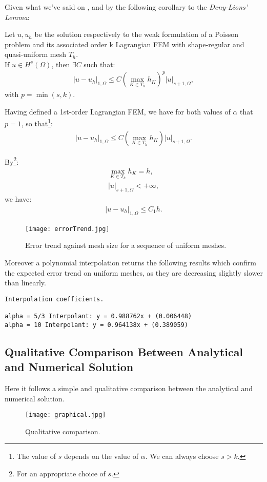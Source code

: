 Given what we've said on , and by the following corollary to the \textit{Deny-Lions' Lemma}:

\begin{theorem}
	Let $u, u_h$ be the solution respectively to the weak formulation of a Poisson problem and its associated order k Lagrangian FEM with shape-regular and quasi-uniform mesh $T_h$. \\ 
	If $u \in H^s(\Omega)$, then $\exists C$ such that:
	\begin{gather}
		|u - u_h|_{1, \Omega} \le C (\max_{K \in T_h} h_K)^{p}|u|_{s+1, \Omega},
	\end{gather}
	with $p = \min(s, k)$.
\end{theorem}

Having defined a 1st-order Lagrangian FEM, we have for both values of $\alpha$ that $p = 1$, so that\footnote{The value of $s$ depends on the value of $\alpha$. We can always choose $s > k$.}:
\begin{gather}
	|u - u_h|_{1, \Omega} \le C (\max_{K \in T_h} h_K)|u|_{s+1, \Omega}.
\end{gather}

By\footnote{For an appropriate choice of $s$.}:
\begin{gather}
	\max_{K \in T_h} h_K = h, \\
	|u|_{s+1, \Omega} < +\infty,
\end{gather}
we have:
\begin{gather}
	|u - u_h|_{1, \Omega} \le C_1 h.
\end{gather}

\begin{figure}[!ht]
	\centering
	\texttt{[image: errorTrend.jpg]}
	\caption{Error trend against mesh size for a sequence of uniform meshes.}
\end{figure}

\noindent Moreover a polynomial interpolation returns the following results which confirm the expected error trend on uniform meshes, as they are decreasing slightly slower than linearly.
\begin{verbatim}
Interpolation coefficients.

alpha = 5/3 Interpolant: y = 0.988762x + (0.006448)
alpha = 10 Interpolant: y = 0.964138x + (0.389059)
\end{verbatim}

\subsection{Qualitative Comparison Between Analytical and Numerical Solution}

Here it follows a simple and qualitative comparison between the analytical and numerical solution.

\begin{figure}[!ht]
	\centering
	\texttt{[image: graphical.jpg]}
	\caption{Qualitative comparison.}
\end{figure}